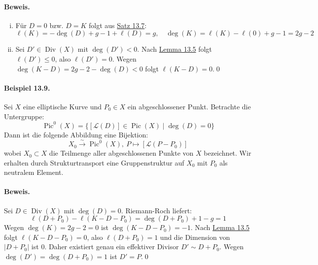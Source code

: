 \paragraph{Beweis.}\begin{enumerate}[(i)]
\item Für $D=0$ bzw. $D=K$ folgt aus \hyperref[13.7]{Satz 13.7}:
\[\ell(K)=-\deg(D)+g-1+\ell(D)=g,\quad \deg(K)=\ell(K)-\ell(0)+g-1=2g-2 \]
\item Sei $D'\in\operatorname{Div}(X)$ mit $\deg(D')<0$. Nach \hyperref[13.5]{Lemma 13.5} folgt $\ell(D')\leq 0$, also $\ell(D')=0$. Wegen $\deg(K-D)=2g-2-\deg(D)<0$ folgt $\ell(K-D)=0$.\qed
\end{enumerate}

\paragraph{Beispiel 13.9.}\label{13.9} Sei $X$ eine elliptische Kurve und $P_0\in X$ ein abgeschlossener Punkt. Betrachte die Untergruppe:
\[\operatorname{Pic}^0(X)=\{[\mathcal{L}(D)]\in\operatorname{Pic}(X)\mid\deg(D)=0 \} \]
Dann ist die folgende Abbildung eine Bijektion:
\[X_0\stackrel{\sim}{\to}\operatorname{Pic}^0(X),\ P\mapsto [\mathcal{L}(P-P_0)] \]
wobei $X_0\subset X$ die Teilmenge aller abgeschlossenen Punkte von $X$ bezeichnet. Wir erhalten durch Strukturtransport eine Gruppenstruktur auf $X_0$ mit $P_0$ als neutralem Element.

\paragraph{Beweis.} Sei $D\in\operatorname{Div}(X)$ mit $\deg(D)=0$. Riemann-Roch liefert:
\[\ell(D+P_0)-\ell(K-D-P_0)=\deg(D+P_0)+1-g=1 \]
Wegen $\deg(K)=2g-2=0$ ist $\deg(K-D-P_0)=-1$. Nach \hyperref[13.5]{Lemma 13.5} folgt $\ell(K-D-P_0)=0$, also $\ell(D+P_0)=1$ und die Dimension von $|D+P_0|$ ist $0$. Daher existiert genau ein effektiver Divisor $D'\sim D+P_0$. Wegen $\deg(D')=\deg(D+P_0)=1$ ist $D'=P$.\qed
